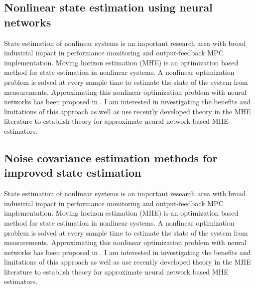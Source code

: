 \documentclass[11pt, a4paper]{article} %
\begin{document}
\subsection*{Nonlinear state estimation using neural networks}

State estimation of nonlinear systems is an important research area with broad 
industrial impact in performance monitoring and output-feedback MPC 
implementation. Moving horizon estimation (MHE) is an optimization based method 
for state estimation in nonlinear systems. A nonlinear optimization problem is 
solved at every sample time to estimate the state of the system from 
measurements. Approximating this nonlinear optimization problem with neural 
networks has been proposed in . I am interested in investigating the benefits 
and limitations of this approach as well as use recently developed theory in 
the MHE literature to establish theory for approximate neural network based MHE 
estimators.

\subsection*{Noise covariance estimation methods for improved state estimation}

State estimation of nonlinear systems is an important research area with broad 
industrial impact in performance monitoring and output-feedback MPC 
implementation. Moving horizon estimation (MHE) is an optimization based method 
for state estimation in nonlinear systems. A nonlinear optimization problem is 
solved at every sample time to estimate the state of the system from 
measurements. Approximating this nonlinear optimization problem with neural 
networks has been proposed in . I am interested in investigating the benefits 
and limitations of this approach as well as use recently developed theory in 
the MHE literature to establish theory for approximate neural network based MHE 
estimators.



\end{document}
